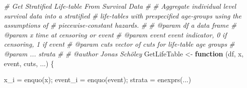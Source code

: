\documentclass[10pt,twoside,reqno]{article}
\newenvironment{Shaded}{}{}
\newcommand{\CommentTok}[1]{\textit{#1}}
\newcommand{\ControlFlowTok}[1]{\textbf{#1}}
\newcommand{\FunctionTok}[1]{#1}
\newcommand{\NormalTok}[1]{#1}
\newcommand{\OtherTok}[1]{#1}
\begin{document}
  \begin{Shaded}
\begin{Highlighting}[]
\CommentTok{\#\textquotesingle{} Get Stratified Life{-}table From Survival Data}
\CommentTok{\#\textquotesingle{}}
\CommentTok{\#\textquotesingle{} Aggregate individual level survival data into a stratified}
\CommentTok{\#\textquotesingle{} life{-}tables with prespecified age{-}groups using the assumptions of}
\CommentTok{\#\textquotesingle{} piecewise{-}constant hazards.}
\CommentTok{\#\textquotesingle{}}
\CommentTok{\#\textquotesingle{} @param df a data frame}
\CommentTok{\#\textquotesingle{} @param x time at censoring or event}
\CommentTok{\#\textquotesingle{} @param event event indicator, 0 if censoring, 1 if event}
\CommentTok{\#\textquotesingle{} @param cuts vector of cuts for life{-}table age groups}
\CommentTok{\#\textquotesingle{} @param ... strata}
\CommentTok{\#\textquotesingle{}}
\CommentTok{\#\textquotesingle{} @author Jonas Schöley}
\NormalTok{GetLifeTable }\OtherTok{\textless{}{-}} \ControlFlowTok{function}\NormalTok{ (df, x, event, cuts, ...) \{}

\NormalTok{  x\_i }\OtherTok{=} \FunctionTok{enquo}\NormalTok{(x); event\_i }\OtherTok{=} \FunctionTok{enquo}\NormalTok{(event); strata }\OtherTok{=} \FunctionTok{enexprs}\NormalTok{(...)}


\end{Highlighting}
\end{Shaded}
\end{document}
